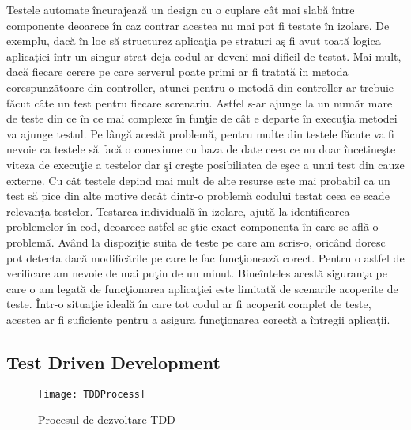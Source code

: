 \documentclass[a4paper,12pt]{report}
\begin{document}
Testele automate \^incurajeaz\u a un design cu o cuplare c\^at mai slab\u a \^intre componente deoarece \^in
caz contrar acestea nu mai pot fi testate \^in izolare. De exemplu, dac\u a \^in loc s\u a structurez aplica\c tia pe 
straturi a\c s fi avut toat\u a logica aplica\c tiei \^intr-un singur strat deja codul ar deveni mai dificil de testat.
Mai mult, dac\u a fiecare cerere pe care serverul poate primi ar fi tratat\u a \^in metoda corespunz\u atoare din controller,
atunci pentru o metod\u a din controller ar trebuie f\u acut c\^ate un test pentru fiecare screnariu.
Astfel s-ar ajunge la un num\u ar mare de teste din ce \^in ce mai complexe \^in fun\c tie de c\^at e departe \^in execu\c tia metodei 
va ajunge testul. Pe l\^ang\u a acest\u a problem\u a, pentru multe din testele f\u acute va fi nevoie ca testele s\u a fac\u a 
o conexiune cu baza de date ceea ce nu doar \^incetine\c ste viteza de execu\c tie a testelor dar \c si cre\c ste posibiliatea de 
e\c sec a unui test din cauze externe. Cu c\^at testele depind mai mult de alte resurse este mai probabil ca un test s\u a pice 
din alte motive dec\^at dintr-o problem\u a codului testat ceea ce scade relevan\c ta testelor. Testarea individual\u a \^in izolare, ajut\u a 
la identificarea problemelor \^in cod, deoarece astfel se \c stie exact componenta \^in care se afl\u a o problem\u a.
Av\^and la dispozi\c tie suita de teste pe care am scris-o, oric\^and doresc pot detecta dac\u a modific\u arile 
pe care le fac func\c tioneaz\u a corect. Pentru o astfel de verificare am nevoie de mai pu\c tin de un minut.
Bine\^inteles acest\u a siguran\c ta pe care o am legat\u a de func\c tionarea aplica\c tiei este limitat\u a
de scenarile acoperite de teste. \^Intr-o situa\c tie ideal\u a \^in care tot codul ar fi acoperit complet de teste,
acestea ar fi suficiente pentru a asigura func\c tionarea corect\u a a \^intregii aplica\c tii. 


\subsection{Test Driven Development}


\begin{figure}[ht]
	\caption{Procesul de dezvoltare TDD}
	\texttt{[image: TDDProcess]}
	\label{fig:TDDProcess}
\end{figure}
\end{document}
